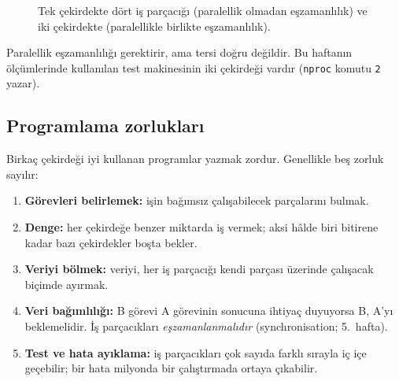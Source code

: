 \documentclass[11pt,a4paper]{article}
\newcommand{\cmd}[1]{\texttt{#1}}
\begin{document}
\begin{figure}[H]
\centering
{}
\caption{Tek çekirdekte dört iş parçacığı (paralellik olmadan eşzamanlılık) ve iki çekirdekte (paralellikle birlikte eşzamanlılık).}
\end{figure}

Paralellik eşzamanlılığı gerektirir, ama tersi doğru değildir. Bu haftanın ölçümlerinde kullanılan test makinesinin iki çekirdeği vardır (\cmd{nproc} komutu \texttt{2} yazar).

\subsection{Programlama zorlukları}

Birkaç çekirdeği iyi kullanan programlar yazmak zordur. Genellikle beş zorluk sayılır:
\begin{enumerate}[leftmargin=1.4em]
  \item \textbf{Görevleri belirlemek:} işin bağımsız çalışabilecek parçalarını bulmak.
  \item \textbf{Denge:} her çekirdeğe benzer miktarda iş vermek; aksi hâlde biri bitirene kadar bazı çekirdekler boşta bekler.
  \item \textbf{Veriyi bölmek:} veriyi, her iş parçacığı kendi parçası üzerinde çalışacak biçimde ayırmak.
  \item \textbf{Veri bağımlılığı:} B görevi A görevinin sonucuna ihtiyaç duyuyorsa B, A'yı beklemelidir. İş parçacıkları \emph{eşzamanlanmalıdır} (synchronisation; 5.~hafta).
  \item \textbf{Test ve hata ayıklama:} iş parçacıkları çok sayıda farklı sırayla iç içe geçebilir; bir hata milyonda bir çalıştırmada ortaya çıkabilir.
\end{enumerate}
\end{document}
